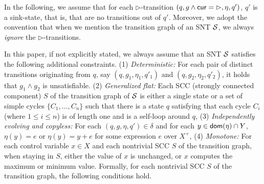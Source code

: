 In the following, we assume that for each $\triangleright$-transition $(q, g \wedge \mathsf{cur} = \rhd, \eta, q')$, $q'$ is a sink-state, that is, that are no transitions out of $q'$. Moreover, we adopt the convention that when we mention the transition graph of an SNT ${\mathcal{S} }$, we always \emph{ignore} the $\triangleright$-transitions. 

In this paper, if not explicitly stated, we always assume that an SNT ${\mathcal{S} }$ satisfies the following additional constraints. (1) \emph{Deterministic:} For each pair of distinct transitions originating from $q$, say $(q, g_1, \eta_1,q'_1)$ and $(q, g_2,\eta_2,q'_2)$, it holds that $g_1 \wedge g_2$ is unsatisfiable. (2) \emph{Generalized flat:} Each SCC (strongly connected component) $S$ of the transition graph of ${\mathcal{S} }$ is either a single state or a set of simple cycles $\{C_1,\dots, C_n\}$ such that there is a state $q$ satisfying that each cycle $C_i$ (where $1 \le i \le n$) is of length one and is a self-loop around $q$,
%
(3) \emph{Independently evolving and copyless:} For each $(q, g, \eta, q') \in \delta$ and for each $y \in \mathsf{dom}(\eta) \cap Y$, $\eta(y)=e$ or $\eta(y)=y+e$ for some expression $e$ over $X^+$, (4) \emph{Monotone:}   For each control variable $x \in X$ and each nontrivial SCC $S$ of the transition graph,  when staying in $S$, either the value of $x$ is unchanged, or $x$ computes the maximum or minimum value. Formally, 
for each nontrivial SCC $S$ of the transition graph, the following conditions hold.
